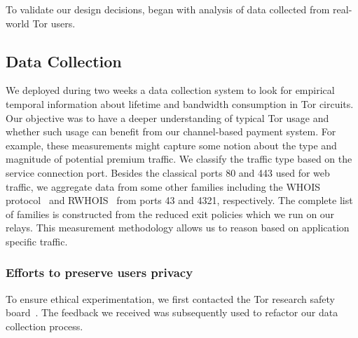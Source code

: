 To validate our design decisions, began with analysis of data collected from
real-world Tor users. 

\subsection{Data Collection}
\label{subsec:datacollection}

We deployed during two weeks a data collection system to look for empirical temporal information
about lifetime and bandwidth consumption in Tor circuits. Our objective was to
have a deeper understanding of typical Tor usage and whether such usage can
benefit from our channel-based payment system. For example, these measurements
might capture some notion about the type and magnitude of potential premium
traffic. We classify the traffic type based on the service connection
port. Besides the classical ports 80 and 443 used for web traffic, we aggregate
data from some other families including the WHOIS
protocol~\cite{daigle2004whois} and RWHOIS~\cite{williamson1994referral} from
ports 43 and 4321, respectively. The complete list of families is constructed
from the reduced exit policies which we run on our relays. This measurement
methodology allows us to reason based on application specific traffic.


\subsubsection{Efforts to preserve users privacy}

To ensure ethical experimentation, we first contacted the Tor research safety
board~\cite{torsafety}. The feedback we received was subsequently used to refactor our data
collection process.

